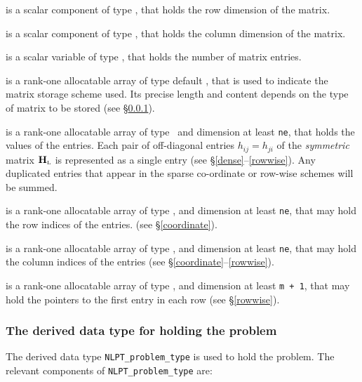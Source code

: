 \documentclass{galahad}
\newcommand{\bmHL}{\bmH\sub{L}}
\begin{document}
\begin{description}

 is a scalar component of type \integer,
that holds the row dimension of the matrix.

 is a scalar component of type \integer,
that holds the column dimension of the matrix.

 is a scalar variable of type \integer, that
holds the number of matrix entries.

 is a rank-one allocatable array of type default \character, that
is used to indicate the matrix storage scheme used. Its precise length and
content depends on the type of matrix to be stored (see \S\ref{typeprob}).

 is a rank-one allocatable array of type \realdp\,
and dimension at least {\tt ne}, that holds the values of the entries.
Each pair of off-diagonal entries $h_{ij} = h_{ji}$ of the {\em symmetric}
matrix $\bmHL$ is represented as a single entry
(see \S\ref{dense}--\ref{rowwise}).
Any duplicated entries that appear in the sparse
co-ordinate or row-wise schemes will be summed.

 is a rank-one allocatable array of type \integer,
and dimension at least {\tt ne}, that may hold the row indices of the entries.
(see \S\ref{coordinate}).

 is a rank-one allocatable array of type \integer,
and dimension at least {\tt ne}, that may hold the column indices of the entries
(see \S\ref{coordinate}--\ref{rowwise}).

 is a rank-one allocatable array of type \integer,
and dimension at least {\tt m + 1}, that may hold the pointers to
the first entry in each row (see \S\ref{rowwise}).

\end{description}


\subsubsection{The derived data type for holding the problem}\label{typeprob}
The derived data type {\tt NLPT\_problem\_type} is used to hold
the problem. The relevant components of
{\tt NLPT\_problem\_type}
are:
\end{document}
